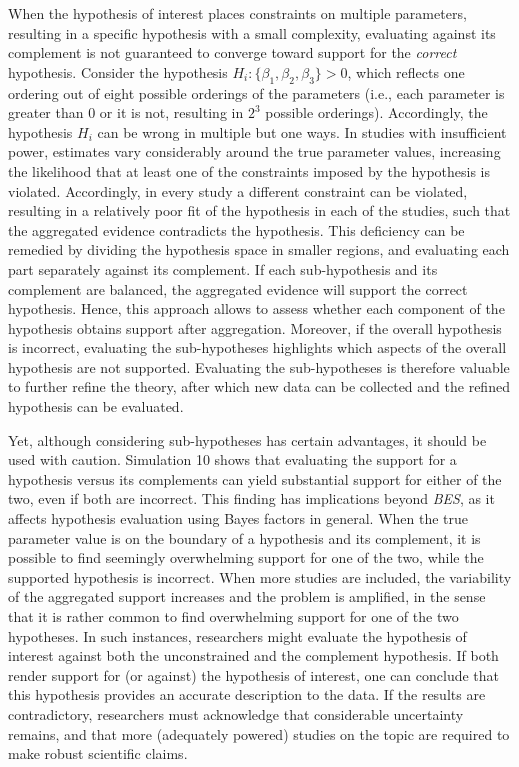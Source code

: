 \documentclass[review, 3p, authoryear]{elsarticle} %
\begin{document}
When the hypothesis of interest places constraints on multiple parameters, resulting in a specific hypothesis with a small complexity, evaluating against its complement is not guaranteed to converge toward support for the \emph{correct} hypothesis.
Consider the hypothesis \(H_i: \{\beta_1, \beta_2, \beta_3\} > 0\), which reflects one ordering out of eight possible orderings of the parameters (i.e., each parameter is greater than 0 or it is not, resulting in \(2^3\) possible orderings).
Accordingly, the hypothesis \(H_i\) can be wrong in multiple but one ways.
In studies with insufficient power, estimates vary considerably around the true parameter values, increasing the likelihood that at least one of the constraints imposed by the hypothesis is violated.
Accordingly, in every study a different constraint can be violated, resulting in a relatively poor fit of the hypothesis in each of the studies, such that the aggregated evidence contradicts the hypothesis.
This deficiency can be remedied by dividing the hypothesis space in smaller regions, and evaluating each part separately against its complement.
If each sub-hypothesis and its complement are balanced, the aggregated evidence will support the correct hypothesis.
Hence, this approach allows to assess whether each component of the hypothesis obtains support after aggregation.
Moreover, if the overall hypothesis is incorrect, evaluating the sub-hypotheses highlights which aspects of the overall hypothesis are not supported.
Evaluating the sub-hypotheses is therefore valuable to further refine the theory, after which new data can be collected and the refined hypothesis can be evaluated.

Yet, although considering sub-hypotheses has certain advantages, it should be used with caution.
Simulation 10 shows that evaluating the support for a hypothesis versus its complements can yield substantial support for either of the two, even if both are incorrect.
This finding has implications beyond \emph{BES}, as it affects hypothesis evaluation using Bayes factors in general.
When the true parameter value is on the boundary of a hypothesis and its complement, it is possible to find seemingly overwhelming support for one of the two, while the supported hypothesis is incorrect.
When more studies are included, the variability of the aggregated support increases and the problem is amplified, in the sense that it is rather common to find overwhelming support for one of the two hypotheses.
In such instances, researchers might evaluate the hypothesis of interest against both the unconstrained and the complement hypothesis.
If both render support for (or against) the hypothesis of interest, one can conclude that this hypothesis provides an accurate description to the data.
If the results are contradictory, researchers must acknowledge that considerable uncertainty remains, and that more (adequately powered) studies on the topic are required to make robust scientific claims.
\end{document}
